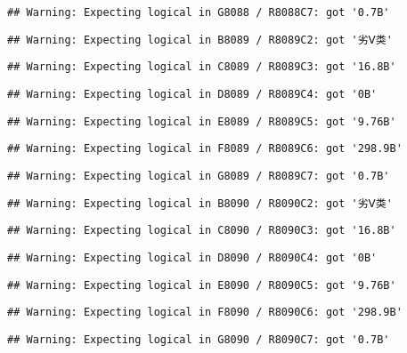 \documentclass[
]{article}
\begin{document}
\begin{verbatim}
## Warning: Expecting logical in G8088 / R8088C7: got '0.7B'
\end{verbatim}

\begin{verbatim}
## Warning: Expecting logical in B8089 / R8089C2: got '劣Ⅴ类'
\end{verbatim}

\begin{verbatim}
## Warning: Expecting logical in C8089 / R8089C3: got '16.8B'
\end{verbatim}

\begin{verbatim}
## Warning: Expecting logical in D8089 / R8089C4: got '0B'
\end{verbatim}

\begin{verbatim}
## Warning: Expecting logical in E8089 / R8089C5: got '9.76B'
\end{verbatim}

\begin{verbatim}
## Warning: Expecting logical in F8089 / R8089C6: got '298.9B'
\end{verbatim}

\begin{verbatim}
## Warning: Expecting logical in G8089 / R8089C7: got '0.7B'
\end{verbatim}

\begin{verbatim}
## Warning: Expecting logical in B8090 / R8090C2: got '劣Ⅴ类'
\end{verbatim}

\begin{verbatim}
## Warning: Expecting logical in C8090 / R8090C3: got '16.8B'
\end{verbatim}

\begin{verbatim}
## Warning: Expecting logical in D8090 / R8090C4: got '0B'
\end{verbatim}

\begin{verbatim}
## Warning: Expecting logical in E8090 / R8090C5: got '9.76B'
\end{verbatim}

\begin{verbatim}
## Warning: Expecting logical in F8090 / R8090C6: got '298.9B'
\end{verbatim}

\begin{verbatim}
## Warning: Expecting logical in G8090 / R8090C7: got '0.7B'
\end{verbatim}
\end{document}
